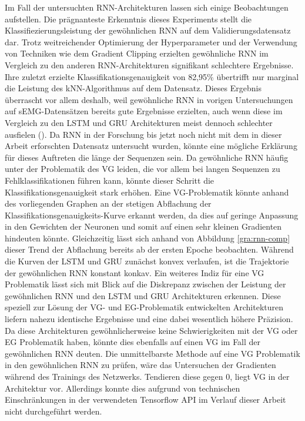 Im Fall der untersuchten RNN-Architekturen lassen sich einige Beobachtungen aufstellen. Die prägnanteste Erkenntnis dieses Experiments stellt die Klassifiezierungsleistung der gewöhnlichen RNN auf dem Validierungsdatensatz dar. Trotz weitreichender Optimierung der Hyperparameter und der Verwendung von Techniken wie dem Gradient Clipping erzielten gewöhnliche RNN im Vergleich zu den anderen RNN-Architekturen signifikant schlechtere Ergebnisse. Ihre zuletzt erzielte Klassifikationsgenauigkeit von 82,95\% übertrifft nur marginal die Leistung des kNN-Algorithmus auf dem Datensatz. Dieses Ergebnis überrascht vor allem deshalb, weil gewöhnliche RNN in vorigen Untersuchungen auf sEMG-Datensätzen bereits gute Ergebnisse erzielten, auch wenn diese im Vergleich zu den LSTM und GRU Architekturen meist dennoch schlechter ausfielen (\cite{simao2019emg}). Da RNN in der Forschung bis jetzt noch nicht mit dem in dieser Arbeit erforschten Datensatz untersucht wurden, könnte eine mögliche Erklärung für dieses Auftreten die länge der Sequenzen sein. Da gewöhnliche RNN häufig unter der Problematik des VG leiden, die vor allem bei langen Sequenzen zu Fehlklassifikationen führen kann, könnte dieser Schritt die Klassifikationsgenauigkeit stark erhöhen. Eine VG-Problematik könnte anhand des vorliegenden Graphen an der stetigen Abflachung der Klassifikationsgenauigkeits-Kurve erkannt werden, da dies auf geringe Anpassung in den Gewichten der Neuronen und somit auf einen sehr kleinen Gradienten hindeuten könnte. Gleichzeitig lässt sich anhand von Abbildung \ref{gra:rnn-comp} dieser Trend der Abflachung bereits ab der ersten Epoche beobachten. Während die Kurven der LSTM und GRU zunächst konvex verlaufen, ist die Trajektorie der gewöhnlichen RNN konstant konkav. Ein weiteres Indiz für eine VG Problematik lässt sich mit Blick auf die Diskrepanz zwischen der Leistung der gewöhnlichen RNN und den LSTM und GRU Architekturen erkennen. Diese speziell zur Lösung der VG- und EG-Problematik entwickelten Architekturen liefern nahezu identische Ergebnisse und eine dabei wesentlich höhere Präzision. Da diese Architekturen gewöhnlicherweise keine Schwierigkeiten mit der VG oder EG Problematik haben, könnte dies ebenfalls auf einen VG im Fall der gewöhnlichen RNN deuten. Die unmittelbarste Methode auf eine VG Problematik in den gewöhnlichen RNN zu prüfen, wäre das Untersuchen der Gradienten während des Trainings des Netzwerks. Tendieren diese gegen 0, liegt VG in der Architektur vor. Allerdings konnte dies aufgrund von technischen Einschränkungen in der verwendeten Tensorflow API im Verlauf dieser Arbeit nicht durchgeführt werden.

